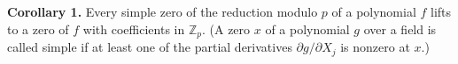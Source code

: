 \textbf{Corollary 1.} Every simple zero of the reduction modulo $p$ of a polynomial $f$ lifts to a zero of $f$ with coefficients in $\mathbb{Z}_p$. (A zero $x$ of a polynomial $g$ over a field is called simple if at least one of the partial derivatives $\partial g/\partial X_j$ is nonzero at $x$.)

